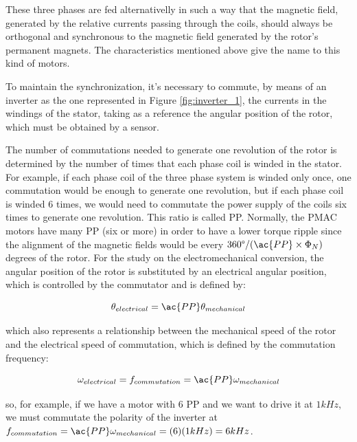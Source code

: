 These three phases are fed alternativelly in such a way that the magnetic field, generated by the relative currents passing through the coils, should always be orthogonal and synchronous to the magnetic field generated by the rotor's permanent magnets. The characteristics mentioned above give the name to this kind of motors. 

To maintain the synchronization, it's necessary to commute, by means of an inverter as the one represented in Figure \ref{fig:inverter_1}, the currents in the windings of the stator, taking as a reference the angular position of the rotor, which must be obtained by a sensor.

The number of commutations needed to generate one revolution of the rotor is determined by the number of times that each phase coil is winded in the stator. For example, if each phase coil of the three phase system is winded only once, one commutation would be enough to generate one revolution, but if each phase coil is winded 6 times, we would need to commutate the power supply of the coils six times to generate one revolution. This ratio is called \acf{PP}. Normally, the \ac{PMAC} motors have many \ac{PP} (six or more) in order to have a lower torque ripple since the alignment of the magnetic fields would be every $360\degree/(\ac{PP} \times \Phi_{N})$ degrees of the rotor. For the study on the electromechanical conversion, the angular position of the rotor is substituted by an electrical angular position, which is controlled by the commutator and is defined by:

\begin{equation}
	\label{eq:pole_pairs}
	\theta_{electrical} = \ac{PP} \theta_{mechanical}
\end{equation}

which also represents a relationship between the mechanical speed of the rotor and the electrical speed of commutation, which is defined by the commutation frequency:

\begin{equation}
	\label{eq:pole_pairs}
	\omega_{electrical} = f_{commutation} = \ac{PP} \omega_{mechanical}
\end{equation}

so, for example, if we have a motor with 6 \ac{PP} and we want to drive it at $1 kHz$, we must commutate the polarity of the inverter at $f_{commutation} = \ac{PP} \omega_{mechanical} = (6) (1 kHz) = 6 kHz$.


